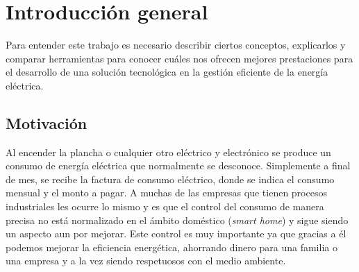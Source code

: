 
\chapter{Introducción general} %

\label{Chapter1} %
\label{IntroGeneral}
Para entender este trabajo es necesario describir ciertos conceptos, explicarlos y comparar herramientas para conocer cuáles nos ofrecen mejores prestaciones para el desarrollo de una solución tecnológica en la gestión eficiente de la energía eléctrica. 

\newcommand{\keyword}[1]{\textbf{#1}}
\newcommand{\tabhead}[1]{\textbf{#1}}
\newcommand{\code}[1]{\texttt{#1}}
\newcommand{\file}[1]{\texttt{\bfseries#1}}
\newcommand{\option}[1]{\texttt{\itshape#1}}
\newcommand{\grados}{$^{\circ}$}



\section{Motivación}

Al encender la plancha o cualquier otro eléctrico y electrónico se produce un consumo de energía eléctrica que normalmente se desconoce. Simplemente a final de mes, se recibe la factura de consumo eléctrico, donde se indica el consumo mensual y el monto a pagar. A muchas de las empresas que tienen procesos industriales les ocurre lo mismo y es que el control del consumo de manera precisa no está normalizado en el ámbito doméstico (\emph{smart home}) y sigue siendo un aspecto aun por mejorar. Este control es muy importante ya que gracias a él podemos mejorar la eficiencia energética, ahorrando dinero para una familia o una empresa y a la vez siendo respetuosos con el medio ambiente.


